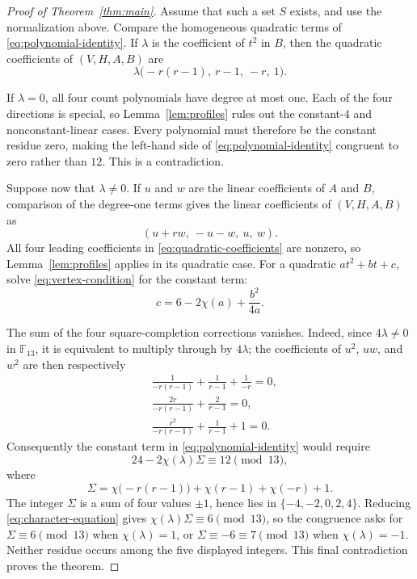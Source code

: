 \documentclass[10pt,a4paper]{amsart}
\newcommand{\F}{\mathbb F}
\begin{document}
\begin{proof}[Proof of Theorem~\ref{thm:main}]
Assume that such a set $S$ exists, and use the normalization above.  Compare
the homogeneous quadratic terms of \eqref{eq:polynomial-identity}.  If
$\lambda$ is the coefficient of $t^2$ in $B$, then the quadratic coefficients
of $(V,H,A,B)$ are
\begin{equation}\label{eq:quadratic-coefficients}
  \lambda\bigl(-r(r-1),\ r-1,\ -r,\ 1\bigr).
\end{equation}

If $\lambda=0$, all four count polynomials have degree at most one.  Each of
the four directions is special, so Lemma~\ref{lem:profiles} rules out the
constant-$4$ and nonconstant-linear cases.  Every polynomial must therefore
be the constant residue zero, making the left-hand side of
\eqref{eq:polynomial-identity} congruent to zero rather than $12$.  This is a
contradiction.

Suppose now that $\lambda\ne0$.  If $u$ and $w$ are the linear coefficients
of $A$ and $B$, comparison of the degree-one terms gives the linear
coefficients of $(V,H,A,B)$ as
\begin{equation}\label{eq:linear-coefficients}
  (u+rw,\ -u-w,\ u,\ w).
\end{equation}
All four leading coefficients in \eqref{eq:quadratic-coefficients} are
nonzero, so Lemma~\ref{lem:profiles} applies in its quadratic case.  For a
quadratic $at^2+bt+c$, solve \eqref{eq:vertex-condition} for the constant
term:
\[
  c=6-2\chi(a)+\frac{b^2}{4a}.
\]

The sum of the four square-completion corrections vanishes.  Indeed, since
$4\lambda\neq0$ in $\F_{13}$, it is equivalent to multiply through by
$4\lambda$; the coefficients of $u^{2}$, $uw$, and $w^{2}$ are then
respectively
\begin{align*}
 &\frac1{-r(r-1)}+\frac1{r-1}+\frac1{-r}=0,\\
 &\frac{2r}{-r(r-1)}+\frac2{r-1}=0,\\
 &\frac{r^2}{-r(r-1)}+\frac1{r-1}+1=0.
\end{align*}
Consequently the constant term in \eqref{eq:polynomial-identity} would require
\begin{equation}\label{eq:character-equation}
  24-2\chi(\lambda)\Sigma\equiv12\pmod{13},
\end{equation}
where
\[
  \Sigma=
  \chi\bigl(-r(r-1)\bigr)+\chi(r-1)+\chi(-r)+1.
\]
The integer $\Sigma$ is a sum of four values $\pm1$, hence lies in
$\{-4,-2,0,2,4\}$.  Reducing \eqref{eq:character-equation} gives
$\chi(\lambda)\Sigma\equiv6\pmod{13}$, so the congruence asks for
$\Sigma\equiv6\pmod{13}$ when $\chi(\lambda)=1$, or
$\Sigma\equiv-6\equiv7\pmod{13}$ when $\chi(\lambda)=-1$.  Neither residue
occurs among the five displayed integers.  This final contradiction proves
the theorem.
\end{proof}
\end{document}
